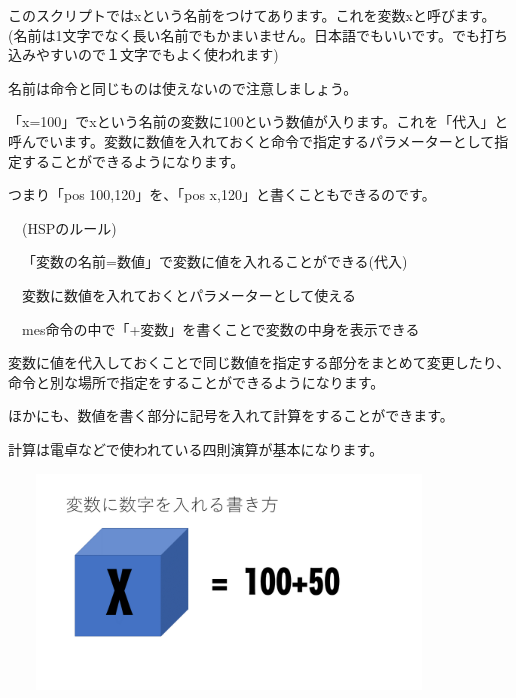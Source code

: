 \documentclass[a4paper,dvipdfmx]{jarticle}
\begin{document}
このスクリプトではxという名前をつけてあります。これを変数xと呼びます。(名前は1文字でなく長い名前でもかまいません。日本語でもいいです。でも打ち込みやすいので１文字でもよく使われます)

名前は命令と同じものは使えないので注意しましょう。


\bigskip

「x=100」でxという名前の変数に100という数値が入ります。これを「代入」と呼んでいます。変数に数値を入れておくと命令で指定するパラメーターとして指定することができるようになります。

つまり「pos 100,120」を、「pos
x,120」と書くこともできるのです。


\bigskip


\bigskip


\bigskip


\bigskip

\ \ (HSPのルール)


\bigskip

\ \ 「変数の名前=数値」で変数に値を入れることができる(代入)

\ \ 変数に数値を入れておくとパラメーターとして使える

\ \ mes命令の中で「+変数」を書くことで変数の中身を表示できる


\bigskip

変数に値を代入しておくことで同じ数値を指定する部分をまとめて変更したり、命令と別な場所で指定をすることができるようになります。


\bigskip

ほかにも、数値を書く部分に記号を入れて計算をすることができます。

計算は電卓などで使われている四則演算が基本になります。


\bigskip



\begin{center}
\includegraphics[width=11.695cm,height=5.741cm]{text02-img/text02-img046.png}

\end{center}
\end{document}
